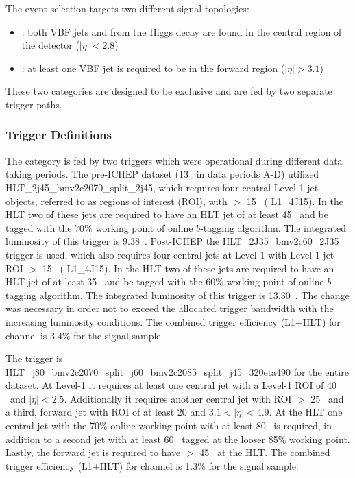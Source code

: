 \label{sec:vbf-evtsel}

The event selection targets two different signal topologies:
\begin{itemize}
\item \fourcentral: both VBF jets and \bjets from the Higgs decay are 
  found in the central region of the detector ($|\eta|<2.8$)
\item \twocentral: at least one VBF jet is required to be
  in the forward region ($|\eta|>3.1$)
\end{itemize}

These two categories are designed to be exclusive and are fed by two separate trigger paths.  

\subsubsection{Trigger Definitions}
The \fourcentral category is fed by two triggers which were operational during different data taking periods.  The pre-ICHEP dataset (13 \ifb~in data periods A-D) utilized HLT\_2j45\_bmv2c2070\_split\_2j45, which requires four central Level-1 jet objects, referred to as regions of interest (ROI),  with \ET $>$ 15 \GeV~( L1\_4J15).  In the HLT two of these jets are required to have an HLT jet \ET of at least 45 \GeV~and be tagged with the 70\% working point of online $b$-tagging algorithm.  The integrated luminosity of this trigger is 9.38~\ifb. Post-ICHEP the  HLT\_2J35\_bmv2c60\_2J35 trigger is used, which also requires four central jets at Level-1  with Level-1 jet ROI \ET $>$ 15 \GeV~( L1\_4J15).  In the HLT two of these jets are required to have an HLT jet \ET of at least 35 \GeV~and be tagged with the 60\% working point of online $b$-tagging algorithm. The integrated luminosity of this trigger is 13.30~\ifb. The change was necessary in order not to exceed the allocated trigger bandwidth with the increasing luminosity conditions. The combined trigger efficiency (L1+HLT) for \fourcentral channel is 3.4\% for the signal sample. 

The \twocentral trigger is HLT\_j80\_bmv2c2070\_split\_j60\_bmv2c2085\_split\_j45\_320eta490 for the entire dataset.  At Level-1 it requires at least one central jet with a Level-1 ROI \ET of 40 \GeV~and $|\eta| < 2.5$.  Additionally it requires another central jet with ROI \ET $>$ 25 \GeV~and a third, forward jet with ROI \ET of at least 20 and   $3.1 < |\eta| < 4.9$.   At the HLT one central jet \btagged  with the 70\% online working point with at least 80 \GeV~is required, in addition to a second jet with at least 60 \GeV~tagged at the looser 85\% working point. Lastly, the forward jet is required to have \ET $>$ 45 \GeV~at the HLT. The combined trigger efficiency (L1+HLT) for \twocentral channel is 1.3\% for the signal sample. 



